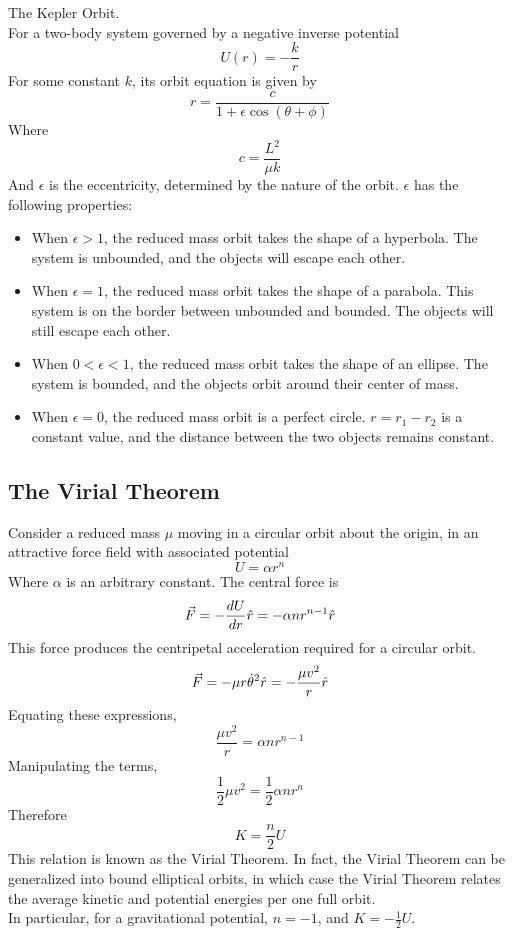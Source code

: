 \documentclass[11pt]{article}
\theoremstyle{gangnamstyle}{\newtheorem{definition}{Definition}[]}
\theoremstyle{gangnamstyle}{\newtheorem{example}{Example}[]}
\theoremstyle{gangnamstyle}{\newtheorem{problem}{Problem}[]}
\theoremstyle{gangnamstyle}{\newtheorem{warning}{Warning}[]}
\begin{document}
\begin{definition}
The Kepler Orbit. \\
For a two-body system governed by a negative inverse potential
\begin{equation}
U(r) = -\frac{k}{r}
\end{equation}
For some constant $k$, its orbit equation is given by
\begin{equation}
r = \frac{c}{1 + \epsilon\cos(\theta + \phi)}
\end{equation}
Where
\begin{equation}
c = \frac{L^2}{\mu k}
\end{equation}
And $\epsilon$ is the eccentricity, determined by the nature of the orbit. $\epsilon$ has the following properties: 
\begin{itemize}
\item When $\epsilon > 1$, the reduced mass orbit takes the shape of a hyperbola. The system is unbounded, and the objects will escape each other. 
\item When $\epsilon = 1$, the reduced mass orbit takes the shape of a parabola. This system is on the border between unbounded and bounded. The objects will still escape each other. 
\item When $0 < \epsilon < 1$, the reduced mass orbit takes the shape of an ellipse. The system is bounded, and the objects orbit around their center of mass. 
\item When $\epsilon = 0$, the reduced mass orbit is a perfect circle. $r = r_1 - r_2$ is a constant value, and the distance between the two objects remains constant. 
\end{itemize}
\end{definition}

\subsection{The Virial Theorem}

Consider a reduced mass $\mu$ moving in a circular orbit about the origin, in an attractive force field with associated potential 
\[ U = \alpha r^n \]
Where $\alpha$ is an arbitrary constant. The central force is
\[ \Vec{F} = -\frac{dU}{dr}\Hat{r} = -\alpha n r^{n - 1}\Hat{r} \]
This force produces the centripetal acceleration required for a circular orbit. 
\[ \Vec{F} = - \mu r\Dot{\theta}^2\Hat{r} = -\frac{\mu v^2}{r}\Hat{r} \]
Equating these expressions, 
\[ \frac{\mu v^2}{r} = \alpha n r^{n - 1} \]
Manipulating the terms, 
\[ \frac{1}{2}\mu v^2 = \frac{1}{2}\alpha n r^n \]
Therefore
\[ K = \frac{n}{2}U \]
This relation is known as the Virial Theorem. In fact, the Virial Theorem can be generalized into bound elliptical orbits, in which case the Virial Theorem relates the average kinetic and potential energies per one full orbit. \\
In particular, for a gravitational potential, $n = -1$, and $K = - \frac{1}{2}U$. 
\end{document}
